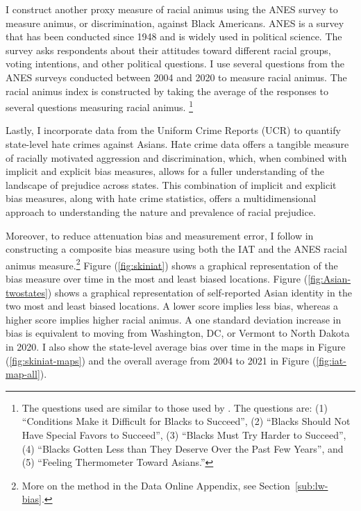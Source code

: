 I construct another proxy measure of racial animus using the ANES survey \textcite{anes2021} to measure animus, or discrimination, against Black Americans. ANES is a survey that has been conducted since 1948 and is widely used in political science. The survey asks respondents about their attitudes toward different racial groups, voting intentions, and other political questions. I use several questions from the ANES surveys conducted between 2004 and 2020 to measure racial animus. The racial animus index is constructed by taking the average of the responses to several questions measuring racial animus. \footnote{The questions used are similar to those used by \textcite{charlesPrejudiceWagesEmpirical2008}. The questions are: (1) ``Conditions Make it Difficult for Blacks to Succeed'', (2) ``Blacks Should Not Have Special Favors to Succeed'', (3) ``Blacks Must Try Harder to Succeed'', (4) ``Blacks Gotten Less than They Deserve Over the Past Few Years'', and (5) ``Feeling Thermometer Toward Asians.''}

Lastly, I incorporate data from the Uniform Crime Reports (UCR) \autocite{ucrbook} to quantify state-level hate crimes against Asians. Hate crime data offers a tangible measure of racially motivated aggression and discrimination, which, when combined with implicit and explicit bias measures, allows for a fuller understanding of the landscape of prejudice across states. This combination of implicit and explicit bias measures, along with hate crime statistics, offers a multidimensional approach to understanding the nature and prevalence of racial prejudice.

Moreover, to reduce attenuation bias and measurement error, I follow \textcite{lubotskyInterpretationRegressionsMultiple2006} in constructing a composite bias measure using both the IAT and the ANES racial animus measure.\footnote{More on the method in the Data Online Appendix, see Section~\ref{sub:lw-bias}.} Figure (\ref{fig:skiniat}) shows a graphical representation of the bias measure over time in the most and least biased locations. Figure (\ref{fig:Asian-twostates}) shows a graphical representation of self-reported Asian identity in the two most and least biased locations. A lower score implies less bias, whereas a higher score implies higher racial animus. A one standard deviation increase in bias is equivalent to moving from Washington, DC, or Vermont to North Dakota in 2020. I also show the state-level average bias over time in the maps in Figure (\ref{fig:skiniat-maps}) and the overall average from 2004 to 2021 in Figure (\ref{fig:iat-map-all}).
